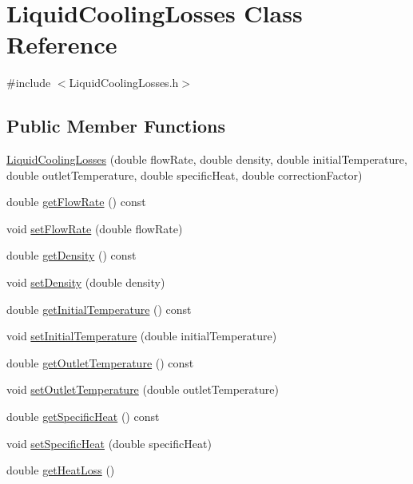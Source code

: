 \hypertarget{class_liquid_cooling_losses}{}\section{Liquid\+Cooling\+Losses Class Reference}
\label{class_liquid_cooling_losses}


{\ttfamily \#include $<$Liquid\+Cooling\+Losses.\+h$>$}

\subsection*{Public Member Functions}
\begin{DoxyCompactItemize}
\item 
\hyperlink{class_liquid_cooling_losses_a91eb84033b28a6bcfc817c08c317e63e}{Liquid\+Cooling\+Losses} (double flow\+Rate, double density, double initial\+Temperature, double outlet\+Temperature, double specific\+Heat, double correction\+Factor)
\item 
double \hyperlink{class_liquid_cooling_losses_acb4a68199bdc5f0597d1feadc3ecdb2c}{get\+Flow\+Rate} () const
\item 
void \hyperlink{class_liquid_cooling_losses_a7739742c5f21919a62c304b7c525b1b6}{set\+Flow\+Rate} (double flow\+Rate)
\item 
double \hyperlink{class_liquid_cooling_losses_ab2a34915eeba8bcea46d67a72cbe17d2}{get\+Density} () const
\item 
void \hyperlink{class_liquid_cooling_losses_a1fcb1780b588e0a6e5ca052ce2b360dc}{set\+Density} (double density)
\item 
double \hyperlink{class_liquid_cooling_losses_a4cfb23800b80e99858bbc5c3ef5169eb}{get\+Initial\+Temperature} () const
\item 
void \hyperlink{class_liquid_cooling_losses_aa7f7718de77a96b8e269a06a24d297d8}{set\+Initial\+Temperature} (double initial\+Temperature)
\item 
double \hyperlink{class_liquid_cooling_losses_ae6364da9b374e95dd657096350464acb}{get\+Outlet\+Temperature} () const
\item 
void \hyperlink{class_liquid_cooling_losses_ab8ea8e748853e18fa480afa0b3e417ee}{set\+Outlet\+Temperature} (double outlet\+Temperature)
\item 
double \hyperlink{class_liquid_cooling_losses_aa60623b6f1fab605d25c9c24e8dd00ec}{get\+Specific\+Heat} () const
\item 
void \hyperlink{class_liquid_cooling_losses_a38ff1ff4dc0de69c72db094bf2259993}{set\+Specific\+Heat} (double specific\+Heat)
\item 
double \hyperlink{class_liquid_cooling_losses_a6a131f8f3141edef7f29df4455c6aee5}{get\+Heat\+Loss} ()
\end{DoxyCompactItemize}


